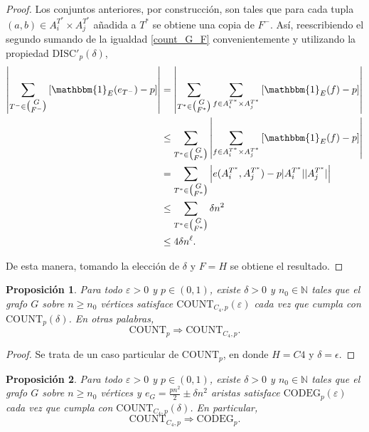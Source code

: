 \documentclass{article}[14pts]
\newtheorem{prop}{Proposición}
\newcommand{\discp}{\mathrm{DISC'}}
\newcommand{\Count}{\mathrm{COUNT}}
\newcommand{\codeg}{\mathrm{CODEG}}
\let\varepsilon=\varepsilon
\begin{document}
\begin{proof}
    Los conjuntos anteriores, por construcción, son tales que para cada tupla $(a,b)\in A_{i}^{T^{*}}\times A_{j}^{T^{*}}$ añadida a $T^{*}$ se obtiene una copia de $F^{-}$. Así, reescribiendo el segundo sumando de la igualdad \eqref{count_G_F} convenientemente y utilizando la propiedad $\discp_p(\delta)$,
    \begin{align*}
        \left| \sum_{T^{-}\in \tbinom{G}{F^{-}}} \left[\mathbbm{1}_{E}(e_{T^{-}}) - p\right]\right|
        &=  \left| \sum_{T^{*}\in \tbinom{G}{F^{*}}}\sum_{f\in A_{i}^{T^{*}}\times A_{j}^{T^{*}}} \left[ \mathbbm{1}_{E}(f) - p\right]\right| \\
        &\leq \sum_{T^{*}\in \tbinom{G}{F^{*}}} \left| \sum_{f\in A_{i}^{T^{*}}\times A_{j}^{T^{*}}} \left[ \mathbbm{1}_{E}(f) - p\right]\right|\\
        &= \sum_{T^{*}\in \tbinom{G}{F^{*}}} \left| e(A_{i}^{T^{*}}, A_{j}^{T^{*}}) - p| A_{i}^{T^{*}} | | A_{j}^{T^{*}}|\right|\\
        &\leq \sum_{T^{*}\in \tbinom{G}{F^{*}}} \delta n^{2}\\
        &\leq 4\delta n^{\ell}.
    \end{align*}

    De esta manera, tomando la elección de $\delta$ y $F=H$ se obtiene el resultado.    
\end{proof}\medskip

\begin{prop} \label{count => C4}
    Para todo $\varepsilon > 0$ y $p\in (0,1)$, existe $\delta > 0$ y $n_0\in \mathbb{N}$ tales que el grafo $G$ sobre $n\geq n_0$ vértices satisface $\Count_{C_4,p} (\varepsilon)$ cada vez que cumpla con $\Count_p(\delta)$. En otras palabras,
    \[
        \Count_p \Rightarrow \Count_{C_4,p}.
    \]
\end{prop}

\begin{proof}
    Se trata de un caso particular de $\Count_p$, en donde $H = C4$ y $\delta = \epsilon$.
\end{proof}\medskip

\begin{prop} \label{C4 => codeg}
    Para todo $\varepsilon > 0$ y $p\in (0,1)$, existe $\delta > 0$ y $n_0\in \mathbb{N}$ tales que el grafo $G$ sobre $n\geq n_0$ vértices y $e_G = \frac{pn^{2}}{2} \pm \delta n^{2}$ aristas satisface $\codeg_p (\varepsilon)$ cada vez que cumpla con $\Count_{C_4,p}(\delta)$. En particular,
    \[
        \Count_{C_4,p} \Rightarrow \codeg_p.
    \]
\end{prop}
\end{document}
